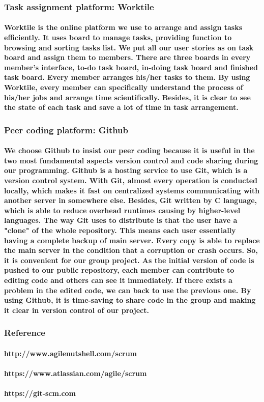 \documentclass[12pt]{amsart}
\begin{document}
\subsubsection{\textbf{Task assignment platform: Worktile}}
\paragraph{Worktile is the online platform we use to arrange and assign tasks efficiently. It uses board to manage tasks, providing function to browsing and sorting tasks list. We put all our user stories as on task board and assign them to members. There are three boards in every member's interface, to-do task board, in-doing task board and finished task board. Every member arranges his/her tasks to them. By using Worktile, every member can specifically understand the process of his/her jobs and arrange time scientifically. Besides, it is clear to see the state of each task and save a lot of time in task arrangement.}



\subsubsection{\textbf{Peer coding platform: Github}}
\paragraph{
We choose Github to insist our peer coding because it is useful in the two most fundamental aspects version control and code sharing during our programming.  Github is a hosting service to use Git, which is a version control system. With Git, almost every operation is conducted locally, which makes it fast on  centralized systems communicating with another server in somewhere else. Besides, Git written by C language, which is able to reduce overhead runtimes causing by higher-level languages.
The way Git uses to distribute is that the user have a "clone" of the whole repository. This means each user essentially having a complete backup of main server. Every copy is able to replace the main server in the condition that a corruption or crash occurs. So, it is convenient for our group project. As the initial version of code is pushed to our public repository, each member can contribute to editing code and others can see it immediately. If there exists a problem in the edited code, we can back to use the previous one. By using Github, it is time-saving to share code in the group and making it clear in version control of our project.}


\subsubsection{\textbf{Reference}}
\paragraph{http://www.agilenutshell.com/scrum}
\paragraph{https://www.atlassian.com/agile/scrum}
\paragraph{https://git-scm.com}
\end{document}
